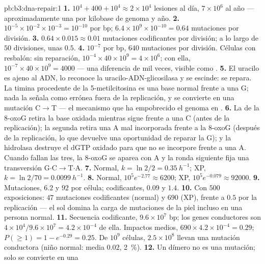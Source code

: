 \begin{solution}{pb:b3:dna-repair:1}
\textbf{1.} $10^{4} + 400 + 10^{4} \approx 2\times 10^{4}$ lesiones al
día, $7\times 10^{6}$ al año --- aproximadamente una por kilobase de
genoma y año.
\textbf{2.} $10^{-5}\times 10^{-2}\times 10^{-3} = 10^{-10}$ por bp;
$6.4\times 10^{9}\times 10^{-10} = 0.64$ mutaciones por división.
\textbf{3.} $0.64\times 0.015 \approx 0.01$ mutaciones codificantes por
división; a lo largo de $50$ divisiones, unas $0.5$.
\textbf{4.} $10^{-7}$ por bp, $640$ mutaciones por división. Células
con resbalón: sin reparación,
$10^{-4}\times 40\times 10^{9} = 4\times 10^{6}$; con ella,
$10^{-7}\times 40\times 10^{9} = 4000$ --- una diferencia de mil veces,
visible como .
\textbf{5.} El uracilo es ajeno al ADN, lo reconoce la
uracilo-ADN-glicosilasa y se escinde: se repara. La timina procedente de
la 5-metilcitosina es una base normal frente a una G; nada la señala como
errónea fuera de la replicación, y se convierte en una mutación
C$\to$T --- el mecanismo que ha empobrecido el genoma en .
\textbf{6.} La  de la 8-oxoG retira la base oxidada mientras
sigue frente a una C (antes de la replicación); la segunda 
retira una A mal incorporada frente a la 8-oxoG (después de la
replicación, lo que devuelve una oportunidad de reparar la G); y la
hidrolasa destruye el dGTP oxidado para que no se incorpore frente a una
A. Cuando fallan las tres, la 8-oxoG se aparea con A y la ronda siguiente
fija una transversión G$\cdot$C$\to$T$\cdot$A.
\textbf{7.} Normal, $k = \ln 2/2 = \qty{0.35}{h^{-1}}$; XP, $k = \ln 2/70
= \qty{0.0099}{h^{-1}}$.
\textbf{8.} Normal, $10^{5} e^{-2.77} \approx 6200$; XP, $10^{5}
e^{-0.079} \approx \num{92000}$.
\textbf{9.} Mutaciones, $6.2$ y $92$ por célula; codificantes, $0.09$ y
$1.4$.
\textbf{10.} Con $500$ exposiciones: $47$ mutaciones codificantes
(normal) y $690$ (XP), frente a $0.5$ por la replicación --- el sol
domina la carga de mutaciones de la piel incluso en una persona normal.
\textbf{11.} Secuencia codificante, $9.6\times 10^{7}$ bp; los genes
conductores son $4\times 10^{4}/9.6\times 10^{7} = 4.2\times 10^{-4}$ de
ella. Impactos medios, $690\times 4.2\times 10^{-4} = 0.29$;
$P(\ge 1) = 1 - e^{-0.29} =
0.25$. De $10^{9}$ células, $2.5\times 10^{8}$ llevan una mutación
conductora (niño normal: media $0.02$, \qty{2}{\%}).
\textbf{12.} Un dímero no es una mutación; solo se convierte en una

\end{solution}
